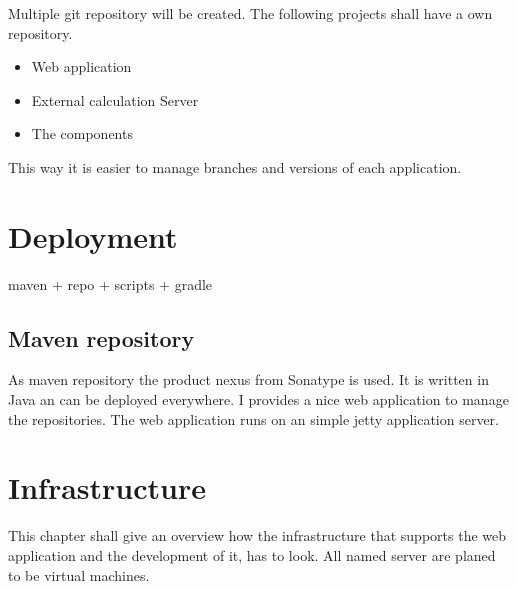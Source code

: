 \documentclass[paper=a4,twoside=false,BCOR=0mm,DIV=calc,fontsize=12pt]{scrartcl}
\begin{document}
Multiple git repository will be created. The following projects shall have a own repository.
\begin{itemize}
 \item Web application
 \item External calculation Server
 \item The components
\end{itemize}

This way it is easier to manage branches and versions of each application.





\section{Deployment}

maven + repo + scripts + gradle


\subsection{Maven repository}
As maven repository the product nexus \cite{nexus} from Sonatype is used. It is written in Java an can be deployed everywhere. I provides a nice web application to manage the repositories. The web application runs on an simple jetty \cite{jetty} application server.



\section{Infrastructure}
This chapter shall give an overview how the infrastructure that supports the web application and the development of it, has to look. 
All named server are planed to be virtual machines.
\end{document}
